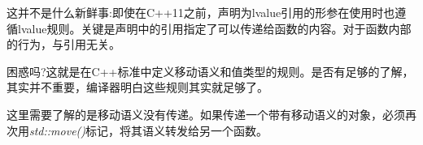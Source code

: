 这并不是什么新鲜事:即使在C++11之前，声明为lvalue引用的形参在使用时也遵循lvalue规则。关键是声明中的引用指定了可以传递给函数的内容。对于函数内部的行为，与引用无关。

困惑吗?这就是在C++标准中定义移动语义和值类型的规则。是否有足够的了解，其实并不重要，编译器明白这些规则其实就足够了。

这里需要了解的是移动语义没有传递。如果传递一个带有移动语义的对象，必须再次用\textit{std::move()}标记，将其语义转发给另一个函数。











































